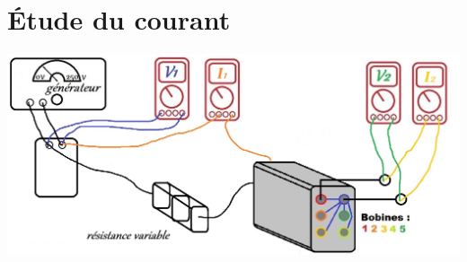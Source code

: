 \documentclass[12pt,a4paper]{article}
\begin{document}
	\section*{Étude du courant}
	\begin{center}
		\includegraphics[scale=0.6]{schema1}
	\end{center}
\end{document}
